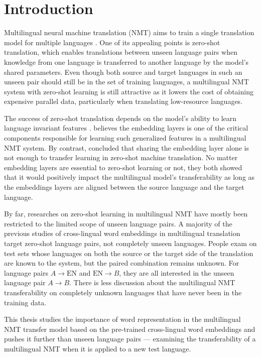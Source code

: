 \documentclass[thesis,fonts=libertine]{cluu}
\begin{document}
\chapter{Introduction}

Multilingual neural machine translation (NMT) aims to train a single translation model for multiple languages \parencite{Johnson:2016aa,aharoni-etal-2019-massively}. One of its appealing points is zero-shot translation, which enables translations between unseen language pairs when knowledge from one language is transferred to another language by the model's shared parameters. Even though both source and target languages in such an unseen pair should still be in the set of training languages, a multilingual NMT system with zero-shot learning is still attractive as it lowers the cost of obtaining expensive parallel data, particularly when translating low-resource languages.

The success of zero-shot translation depends on the model's ability to learn language invariant features \parencite{Arivazhagan:2019aa}. \textcite{Kim:2019aa} believes the embedding layers is one of the critical components responsible for learning such generalized features in a multilingual NMT system. By contrast, \textcite{aji-etal-2020-neural} concluded that sharing the embedding layer alone is not enough to transfer learning in zero-shot machine translation. No matter embedding layers are essential to zero-shot learning or not, they both showed that it would positively impact the multilingual model's transferability as long as the embeddings layers are aligned between the source language and the target language.

By far, researches on zero-shot learning in multilingual NMT have mostly been restricted to the limited scope of unseen language pairs. A majority of the previous studies of cross-lingual word embeddings in multilingual translation target zero-shot language pairs, not completely unseen languages. People exam on test sets whose languages on both the source or the target side of the translation are known to the system, but the paired combination remains unknown. For language pairs $A \rightarrow \text{EN}$ and $\text{EN} \rightarrow B$, they are all interested in the unseen language pair $A \rightarrow B$. There is less discussion about the multilingual NMT transferability on completely unknown languages that have never been in the training data.

This thesis studies the importance of word representation in the multilingual NMT transfer model based on the pre-trained cross-lingual word embeddings \parencite{Bojanowski:2016aa,Ammar:2016aa,Joulin:2018aa,Ruder:2019aa} and pushes it further than unseen language pairs --- examining the transferability of a multilingual NMT when it is applied to a new test language.
\end{document}
